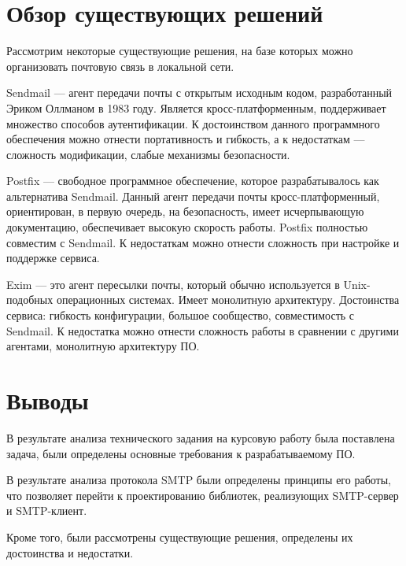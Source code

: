 \section{Обзор существующих решений}

Рассмотрим некоторые существующие решения, на базе которых можно организовать почтовую связь в локальной сети.

Sendmail --- агент передачи почты с открытым исходным кодом, разработанный Эриком Оллманом в 1983 году. Является кросс-платформенным, поддерживает множество способов аутентификации. К достоинством данного программного обеспечения можно отнести портативность и гибкость, а к недостаткам --- сложность модификации, слабые механизмы безопасности.

Postfix --- свободное программное обеспечение, которое разрабатывалось как альтернатива Sendmail. Данный агент передачи почты кросс-платформенный, ориентирован, в первую очередь, на безопасность, имеет исчерпывающую документацию, обеспечивает высокую скорость работы. Postfix полностью совместим с Sendmail. К недостаткам можно отнести сложность при настройке и поддержке сервиса.

Exim --- это агент пересылки почты, который обычно используется в Unix-подобных операционных системах. Имеет монолитную архитектуру. Достоинства сервиса: гибкость конфигурации, большое сообщество, совместимость с Sendmail. К недостатка можно отнести сложность работы в сравнении с другими агентами, монолитную архитектуру ПО.

\section{Выводы}

В результате анализа технического задания на курсовую работу была поставлена задача, были определены основные требования к разрабатываемому ПО.

В результате анализа протокола SMTP были определены принципы его работы, что позволяет перейти к проектированию библиотек, реализующих SMTP-сервер и SMTP-клиент.

Кроме того, были рассмотрены существующие решения, определены их достоинства и недостатки.